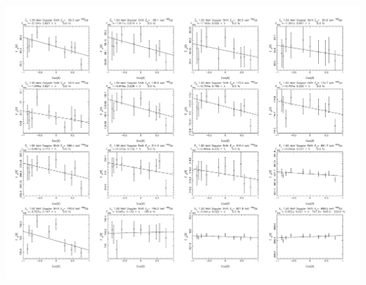 \begin{center}
\includegraphics[page=3,angle=90,height=0.95\textheight]{160Gd_15_DSAM.pdf}
\end{center}
